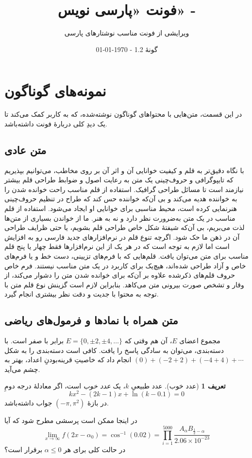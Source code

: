 \documentclass[10pt,a5paper]{article}
\title{\textbf{فونت «پارسی نویس» - \lr{``Parsi Nevis''}}}
\author{ویرایشی از فونت \lr{Scheherazade New} مناسب نوشتارهای پارسی}
\date{%
گونۀ 1.2
\quad - \quad \today \\
\lr{Version 2.1 \quad - \quad \latintoday}
}
\theoremstyle{definition}
\newtheorem{definition}{تعریف}[section]
\theoremstyle{plain}
\begin{document}
\maketitle

\section{نمونه‌های گوناگون}
در این قسمت، متن‌هایی با محتواهای گوناگون نوشته‌شده، که به کاربر کمک می‌کند تا یک دیدِ کلی دربارۀ فونت داشته‌باشد.

\subsection{متن عادی}
با نگاه دقیق‌تر به قلم و کیفیت خوانایی آن و اثر آن بر روی مخاطب، می‌توانیم بپذیریم که تایپوگرافی و حروف‌چینی یک متن به رعایت اصول و ضوابط طراحی قلم بیشتر نیازمند است تا مسائل طراحی گرافیک. استفاده از قلم مناسب راحت خوانده شدن را به خواننده هدیه می‌کند و بی آن‌که خواننده حس کند که طراح در تنظیم حروف‌چینی هنرنمایی کرده است، محیط مناسبی برای خوانایی او ایجاد می‌شود. استفاده از قلم مناسب در یک متن به‌ضرورت نظر دارد و نه به هنر. ما از خواندن بسیاری از متن‌ها لذت می‌بریم، بی آن‌که شیفتهٔ شکل خاص طراحی قلم بشویم، یا حتی ظرایف طراحی آن در ذهن ما حک شود. اگرچه تنوع قلم در نرم‌افزارهای جدید فارسی رو به افزایش است اما لازم به توجه است که در هر یک از این نرم‌افزارها فقط چهار یا پنج قلم مناسب برای متن می‌توان یافت. قلم‌هایی که با فرم‌های تزیینی، دست خط و یا فرم‌های خاص و آزاد طراحی شده‌اند، هیچ‌یک برای کاربرد در یک متن مناسب نیستند. فرم خاص حروف قلم‌های ذکرشده علاوه بر آن‌که برای خوانده شدن متن را دشوار می‌کند، از وقار و تشخص صورت بیرونی متن می‌کاهد. بنابراین لازم است گزینش نوع قلم متن با توجه به محتوا با جدیت و دقت نظر بیشتری انجام گیرد.

\subsection{متن همراه با نمادها و فرمول‌های ریاضی}
مجموع اعضای $E$، آن هم وقتی که $E=\{0,\pm2,\pm4,\ldots\}$ برابر با صفر است. با دسته‌بندی، می‌توان به سادگی پاسخ را یافت. کافی است دسته‌بندی را به شکل $(0)+(-2+2)+(-4+4)+\cdots$ انجام داد که خاصیتِ قرینه‌بودنِ اعداد، بهتر به چشم می‌آید.
\begin{definition}[عدد خوب]
عدد طبیعیِ $k$، یک \emph{عدد خوب }است، اگر معادلۀ درجه دومِ
\[kx^2-(2k-1)x+\ln(k-0.1)=0\]
در بازۀ $(-\pi,\pi^2)$ جواب داشته‌باشد.
\end{definition}
در اینجا ممکن است پرسشی مطرح شود که آیا
\[\lim_{x\to\infty} f(2x-\alpha_0)=\cos^{-1}(0.02)
=\prod_{i=1}^{5000} \frac{A_\alpha B_{\frac{1}{2}-\alpha}}{2.06\times10^{-23}}
\]
در حالت کلی برای هر $\alpha\leq0$ برقرار است؟
\end{document}
